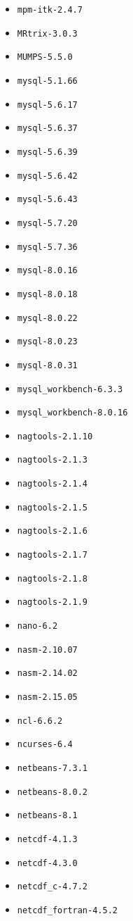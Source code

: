 \begin{itemize}
\item \verb|mpm-itk-2.4.7|
\item \verb|MRtrix-3.0.3|
\item \verb|MUMPS-5.5.0|
\item \verb|mysql-5.1.66|
\item \verb|mysql-5.6.17|
\item \verb|mysql-5.6.37|
\item \verb|mysql-5.6.39|
\item \verb|mysql-5.6.42|
\item \verb|mysql-5.6.43|
\item \verb|mysql-5.7.20|
\item \verb|mysql-5.7.36|
\item \verb|mysql-8.0.16|
\item \verb|mysql-8.0.18|
\item \verb|mysql-8.0.22|
\item \verb|mysql-8.0.23|
\item \verb|mysql-8.0.31|
\item \verb|mysql_workbench-6.3.3|
\item \verb|mysql_workbench-8.0.16|
\item \verb|nagtools-2.1.10|
\item \verb|nagtools-2.1.3|
\item \verb|nagtools-2.1.4|
\item \verb|nagtools-2.1.5|
\item \verb|nagtools-2.1.6|
\item \verb|nagtools-2.1.7|
\item \verb|nagtools-2.1.8|
\item \verb|nagtools-2.1.9|
\item \verb|nano-6.2|
\item \verb|nasm-2.10.07|
\item \verb|nasm-2.14.02|
\item \verb|nasm-2.15.05|
\item \verb|ncl-6.6.2|
\item \verb|ncurses-6.4|
\item \verb|netbeans-7.3.1|
\item \verb|netbeans-8.0.2|
\item \verb|netbeans-8.1|
\item \verb|netcdf-4.1.3|
\item \verb|netcdf-4.3.0|
\item \verb|netcdf_c-4.7.2|
\item \verb|netcdf_fortran-4.5.2|

\end{itemize}
